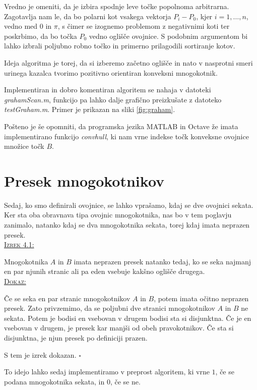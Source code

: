 \documentclass[a4paper, 12pt]{article} %
\newenvironment{matematika}[1]{
{\underline{\textsc{#1:}}}
}{
}
\begin{document}
Vredno je omeniti, da je izbira spodnje leve točke popolnoma arbitrarna. Zagotavlja nam le, da bo polarni kot vsakega vektorja $P_i - P_0$, kjer $i = 1, \dots, n$, vedno med $0$ in $\pi$, s čimer se izognemo problemom z negativnimi koti ter poskrbimo, da bo točka $P_0$ vedno oglišče ovojnice. S podobnim argumentom bi lahko izbrali poljubno robno točko in primerno prilagodili sortiranje kotov.


Ideja algoritma je torej, da si izberemo začetno oglišče in nato v nasprotni smeri urinega kazalca tvorimo pozitivno orientiran konveksni mnogokotnik.


Implementiran in dobro komentiran algoritem se nahaja v datoteki \emph{grahamScan.m}, funkcijo pa lahko dalje grafično preizkušate z datoteko \emph{testGraham.m}. Primer je prikazan na sliki \ref{fig:graham}.


Pošteno je še opomniti, da programska jezika MATLAB in Octave že imata implementirano funkcijo \emph{convhull}, ki nam vrne indekse točk konveksne ovojnice množice točk $B$.

\section{Presek mnogokotnikov}

Sedaj, ko smo definirali ovojnice, se lahko vprašamo, kdaj se dve ovojnici sekata. Ker sta oba obravnava tipa ovojnic mnogokotnika, nas bo v tem poglavju zanimalo, natanko kdaj se dva mnogokotnika sekata, torej kdaj imata neprazen presek.\\
\begin{matematika}{Izrek 4.1}
Mnogokotnika $A$ in $B$ imata neprazen presek natanko tedaj, ko se seka najmanj en par njunih stranic ali pa eden vsebuje kakšno oglišče drugega.\\
\end{matematika}
\begin{matematika}{Dokaz}
Če se seka en par stranic mnogokotnikov $A$ in $B$, potem imata očitno neprazen presek.
Zato privzemimo, da se poljubni dve stranici mnogokotnikov $A$ in $B$ ne sekata. Potem je bodisi en vsebovan v drugem bodisi sta si disjunktna. Če je en vsebovan v drugem, je presek kar manjši od obeh pravokotnikov. Če sta si disjunktna, je njun presek po definiciji prazen.

S tem je izrek dokazan.\hspace*{\fill} $\square$
\end{matematika}

To idejo lahko sedaj implementiramo v preprost algoritem, ki vrne $1$, če se podana mnogokotnika sekata, in $0$, če se ne.
\end{document}
